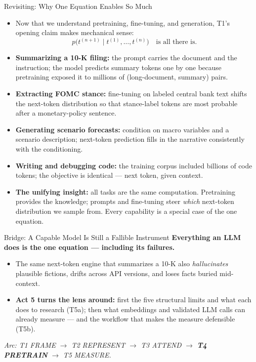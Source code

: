 \begin{frame}{Revisiting: Why One Equation Enables So Much}
\begin{itemize}
\item Now that we understand pretraining, fine-tuning, and generation, T1's opening claim makes mechanical sense:
\[
   p\bigl(t^{(n+1)} \mid t^{(1)}, \ldots, t^{(n)}\bigr) \quad \text{is all there is.}
\]

\medskip
\item \textbf{Summarizing a 10-K filing:} the prompt carries the document and the instruction; the model predicts summary tokens one by one because pretraining exposed it to millions of (long-document, summary) pairs.

\medskip
\item \textbf{Extracting FOMC stance:} fine-tuning on labeled central bank text shifts the next-token distribution so that stance-label tokens are most probable after a monetary-policy sentence.

\medskip
\item \textbf{Generating scenario forecasts:} condition on macro variables and a scenario description; next-token prediction fills in the narrative consistently with the conditioning.

\medskip
\item \textbf{Writing and debugging code:} the training corpus included billions of code tokens; the objective is identical --- next token, given context.

\medskip
\item \textbf{The unifying insight:} all tasks are the same computation. Pretraining provides the knowledge; prompts and fine-tuning steer \emph{which} next-token distribution we sample from. Every capability is a special case of the one equation.
\end{itemize}
\end{frame}

\begin{frame}{Bridge: A Capable Model Is Still a Fallible Instrument}
\textbf{Everything an LLM does is the one equation --- including its failures.}
\begin{itemize}
\item The same next-token engine that summarizes a 10-K also \emph{hallucinates} plausible fictions, drifts across API versions, and loses facts buried mid-context.
\item \textbf{Act 5 turns the lens around:} first the five structural limits and what each does to research (T5a); then what embeddings and validated LLM calls can already measure --- and the workflow that makes the measure defensible (T5b).
\end{itemize}
\bigskip
\centering\footnotesize\textit{Arc: T1 FRAME $\to$ T2 REPRESENT $\to$ T3 ATTEND $\to$ \textbf{T4 PRETRAIN} $\to$ T5 MEASURE.}
\end{frame}


